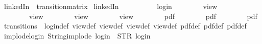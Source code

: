\begin{isabellebody}
{\isasymrparr}{\isachardoublequoteclose}\isanewline
\isanewline
{}\isamarkupfalse%
\ {\isachardoublequoteopen}linkedIn{\isachardoublequoteclose}\ {\isacharcolon}{\isacharcolon}\ {\isachardoublequoteopen}transition{\isacharunderscore}matrix{\isachardoublequoteclose}\ \isanewline
{\isachardoublequoteopen}linkedIn\ {\isasymequiv}\ {\isacharbraceleft}{\isacharbar}\isanewline
\ \ \ \ \ \ {\isacharparenleft}{\isacharparenleft}{}{\isacharcomma}\ {}{\isacharparenright}{\isacharcomma}\ login{\isacharparenright}{\isacharcomma}\isanewline
\ \ \ \ \ \ {\isacharparenleft}{\isacharparenleft}{}{\isacharcomma}\ {}{\isacharparenright}{\isacharcomma}\ view{\isacharparenright}{\isacharcomma}\isanewline
\ \ \ \ \ \ {\isacharparenleft}{\isacharparenleft}{}{\isacharcomma}\ {}{\isacharparenright}{\isacharcomma}\ view{}{\isacharparenright}{\isacharcomma}\isanewline
\ \ \ \ \ \ {\isacharparenleft}{\isacharparenleft}{}{\isacharcomma}\ {}{\isacharparenright}{\isacharcomma}\ view{}{\isacharparenright}{\isacharcomma}\isanewline
\ \ \ \ \ \ {\isacharparenleft}{\isacharparenleft}{}{\isacharcomma}\ {}{\isacharparenright}{\isacharcomma}\ view{}{\isacharparenright}{\isacharcomma}\isanewline
\ \ \ \ \ \ {\isacharparenleft}{\isacharparenleft}{}{\isacharcomma}\ {}{\isacharparenright}{\isacharcomma}\ pdf{\isacharparenright}{\isacharcomma}\isanewline
\ \ \ \ \ \ {\isacharparenleft}{\isacharparenleft}{}{\isacharcomma}\ {}{\isacharparenright}{\isacharcomma}\ pdf{}{\isacharparenright}{\isacharcomma}\isanewline
\ \ \ \ \ \ {\isacharparenleft}{\isacharparenleft}{}{\isacharcomma}\ {}{\isacharparenright}{\isacharcomma}\ pdf{}{\isacharparenright}\isanewline
{\isacharbar}{\isacharbraceright}{\isachardoublequoteclose}\isanewline
\isanewline
{}\isamarkupfalse%
\ transitions\ {\isacharequal}\ login{\isacharunderscore}def\ view{\isacharunderscore}def\ view{}{\isacharunderscore}def\ view{}{\isacharunderscore}def\ view{}{\isacharunderscore}def\ pdf{\isacharunderscore}def\ pdf{}{\isacharunderscore}def\ pdf{}{\isacharunderscore}def\isanewline
\isanewline
{}\isamarkupfalse%
\ implode{\isacharunderscore}login{\isacharcolon}\ {\isachardoublequoteopen}String{\isachardot}implode\ {\isacharprime}{\isacharprime}login{\isacharprime}{\isacharprime}\ {\isacharequal}\ STR\ {\isacharprime}{\isacharprime}login{\isacharprime}{\isacharprime}{\isachardoublequoteclose}\isanewline

\end{isabellebody}
